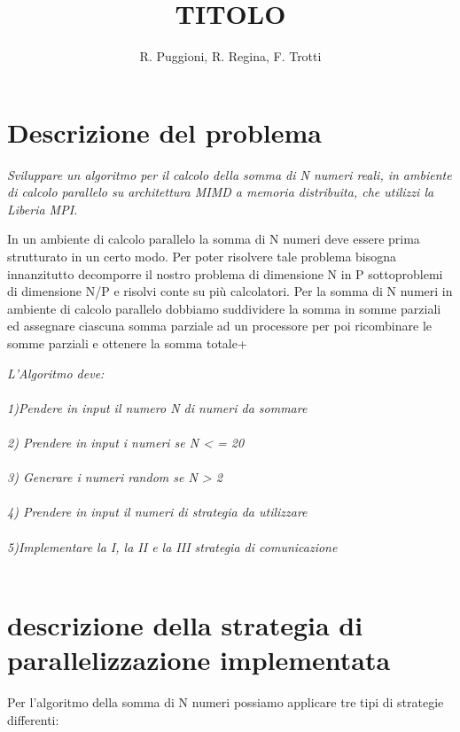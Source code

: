 \documentclass[a4paper,12pt]{article}
\author{R. Puggioni, R. Regina, F. Trotti}
\title{TITOLO}
\begin{document}
\maketitle

\clearpage
\printindex
\clearpage

\tableofcontents

\newpage

\section{Descrizione del problema}
\textit{Sviluppare un algoritmo per il calcolo della somma di N numeri reali, in ambiente di calcolo parallelo su architettura MIMD a memoria distribuita, che utilizzi la Liberia MPI.}





In un ambiente di calcolo parallelo la somma di N numeri deve essere prima strutturato in un certo modo. Per poter risolvere tale problema bisogna innanzitutto decomporre il nostro problema di dimensione N in P sottoproblemi di dimensione N/P e risolvi conte su più calcolatori. 
Per la somma di N numeri in ambiente di calcolo parallelo dobbiamo suddividere la somma in somme parziali ed assegnare ciascuna somma parziale ad un processore per poi ricombinare le somme parziali e ottenere la somma totale+

\textit{L'Algoritmo deve: \\ \\
1)Pendere in input il numero N di numeri da sommare \\ \\
2) Prendere in input i numeri se N < = 20\\ \\
3) Generare i numeri random se N > 2 \\ \\
4) Prendere in input il numeri di strategia da utilizzare \\ \\
5)Implementare la I, la II e la III strategia di comunicazione \\ \\
}




\section{descrizione della strategia di parallelizzazione implementata}

Per l'algoritmo della somma di N numeri possiamo applicare tre tipi di  strategie differenti:
\end{document}

